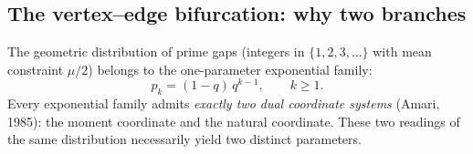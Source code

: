 \documentclass[12pt,a4paper]{article}
\begin{document}
\subsection{The vertex--edge bifurcation: why two branches}
\label{app:branches}

The geometric distribution of prime gaps (integers in
$\{1,2,3,\ldots\}$ with mean constraint $\mu/2$) belongs to the
one-parameter exponential family:
\begin{equation}
  p_k = (1-q)\,q^{k-1}, \qquad k \geq 1.
  \tag{A.5}
\end{equation}
Every exponential family admits \emph{exactly two dual coordinate
systems} (Amari, 1985): the moment coordinate and the natural
coordinate. These two readings of the same distribution necessarily
yield two distinct parameters.
\end{document}
